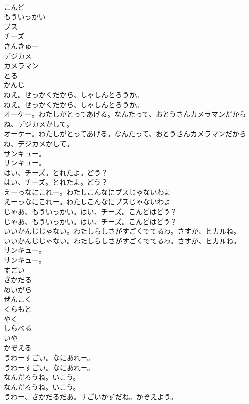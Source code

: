 \documentclass[8pt]{extreport}
\begin{document}
\begin{CJK}{UTF8}{min}
\\	こんど
\\	もういっかい
\\	ブス
\\	チーズ
\\	さんきゅー
\\	デジカメ
\\	カメラマン
\\	とる
\\	かんじ
\\	ねえ。せっかくだから、しゃしんとろうか。
\\	ねえ。せっかくだから、しゃしんとろうか。
\\	オーケー。わたしがとってあげる。なんたって、おとうさんカメラマンだからね、デジカメかして。
\\	オーケー。わたしがとってあげる。なんたって、おとうさんカメラマンだからね、デジカメかして。
\\	サンキュー。
\\	サンキュー。
\\	はい、チーズ。とれたよ。どう？
\\	はい、チーズ。とれたよ。どう？
\\	えーっなにこれー。わたしこんなにブスじゃないわよ
\\	えーっなにこれー。わたしこんなにブスじゃないわよ
\\	じゃあ、もういっかい。はい、チーズ。こんどはどう？
\\	じゃあ、もういっかい。はい、チーズ。こんどはどう？
\\	いいかんじじゃない。わたしらしさがすごくでてるわ。さすが、ヒカルね。
\\	いいかんじじゃない。わたしらしさがすごくでてるわ。さすが、ヒカルね。
\\	サンキュー。
\\	サンキュー。
\\	すごい
\\	さかだる
\\	めいがら
\\	ぜんこく
\\	くらもと
\\	やく
\\	しらべる
\\	いや
\\	かぞえる
\\	うわーすごい。なにあれー。
\\	うわーすごい。なにあれー。
\\	なんだろうね。いこう。
\\	なんだろうね。いこう。
\\	うわー、さかだるだあ。すごいかずだね。かぞえよう。

\end{CJK}
\end{document}
